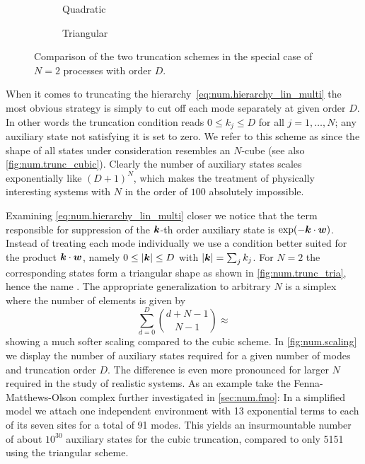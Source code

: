 \begin{figure}
  \centering
  \begin{subfigure}[b]{.4\textwidth}
    \centering
    \caption{Quadratic}
    \label{fig:num.trunc_cubic}
  \end{subfigure}
  \qquad
  \begin{subfigure}[b]{.4\textwidth}
    \centering
    \caption{Triangular}
    \label{fig:num.trunc_tria}
  \end{subfigure}
\caption{Comparison of the two truncation schemes in the special case of $N=2$ processes with order $D$.}
\label{fig:num.trunc}
\end{figure}
When it comes to truncating the hierarchy~\ref{eq:num.hierarchy_lin_multi} the most obvious strategy is simply to cut off each mode separately at given order $D$.
In other words the truncation condition reads $0 \le k_j \le D$ for all $j=1,\dots,N$; any auxiliary state not satisfying it is set to zero.
We refer to this scheme as  since the shape of all states under consideration resembles an $N$-cube (see also \autoref{fig:num.trunc_cubic}).
Clearly the number of auxiliary states scales exponentially like $(D+1)^N$, which makes the treatment of physically interesting systems with $N$ in the order of $100$ absolutely impossible.

Examining \autoref{eq:num.hierarchy_lin_multi} closer we notice that the term responsible for suppression of the $\boldsymbol{k}$-th order auxiliary state is $\exp(-\kk \cdot \ww)$.
Instead of treating each mode individually we use a condition better suited for the product $\boldsymbol{k}\cdot\boldsymbol{w}$, namely $0 \le \left\vert \boldsymbol{k} \right\vert \le D$ with $\left\vert \boldsymbol{k} \right\vert = \sum_j k_j$.
For $N=2$ the corresponding states form a triangular shape as shown in \autoref{fig:num.trunc_tria}, hence the name .
The appropriate generalization to arbitrary $N$ is a simplex where the number of elements is given by
\begin{equation*}
  \sum_{d=0}^D {d + N - 1 \choose N - 1} \approx %
\end{equation*}
showing a much softer scaling compared to the cubic scheme.
In \autoref{fig:num.scaling} we display the number of auxiliary states required for a given number of modes and truncation order $D$.
The difference is even more pronounced for larger $N$ required in the study of realistic systems.
As an example take the Fenna-Matthews-Olson complex further investigated in \autoref{sec:num.fmo}:
In a simplified model we attach one independent environment with 13 exponential terms to each of its seven sites for a total of 91 modes.
This yields an insurmountable number of about $10^{30}$ auxiliary states for the cubic truncation, compared to only 5151 using the triangular scheme.

